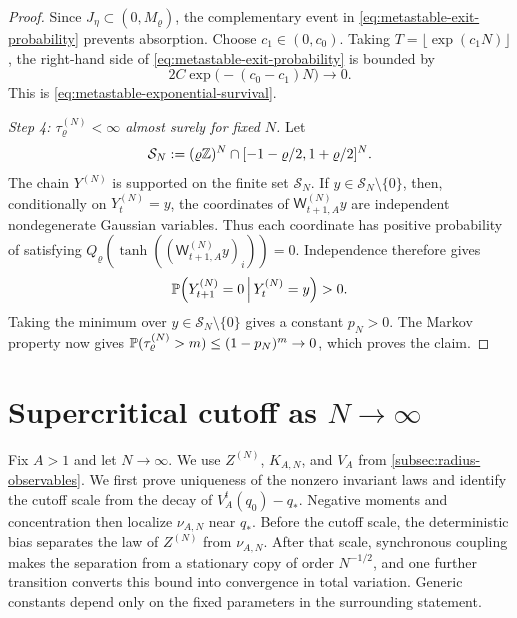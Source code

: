 \documentclass[11pt,reqno,a4paper]{article}
\newcommand{\Pp}{\P}
\begin{document}
\begin{proof}
  Since $J_\eta\subset(0,M_\varrho)$, the complementary event in
  \cref{eq:metastable-exit-probability} prevents absorption. Choose
  $c_1\in(0,c_0)$. Taking
  $T=\lfloor\exp(c_1N)\rfloor$, the right-hand side of
  \cref{eq:metastable-exit-probability} is bounded by
  \begin{equation*}
    2C\exp\bigl(-(c_0-c_1)N\bigr)
    \longrightarrow0.
  \end{equation*}
  This is \cref{eq:metastable-exponential-survival}.

  \emph{Step 4: $\tau_\varrho^{(N)}<\infty$ almost surely for fixed $N$.}
  Let
  \begin{equation*}
    \mathcal S_N
    :=
    (\varrho\mathbb{Z})^N\cap[-1-\varrho/2,1+\varrho/2]^N .
  \end{equation*}
  The chain $Y^{(N)}$ is supported on the finite set $\mathcal S_N$. If
  $y\in\mathcal S_N\setminus\{0\}$, then, conditionally on $Y_t^{(N)}=y$, the
  coordinates of $\mathsf W_{t+1,A}^{(N)}y$ are independent nondegenerate
  Gaussian variables. Thus each coordinate has positive probability of
  satisfying $Q_\varrho(\tanh((\mathsf W_{t+1,A}^{(N)}y)_i))=0$. Independence
  therefore gives
  \begin{equation*}
    \Pp\left(Y_{t+1}^{(N)}=0\,\middle|\,Y_t^{(N)}=y\right)>0 .
  \end{equation*}
  Taking the minimum over $y\in\mathcal S_N\setminus\{0\}$ gives a constant
  $p_N>0$. The Markov property now gives
  $\Pp(\tau_\varrho^{(N)}>m)\leq(1-p_N)^m\to0$, which proves the claim.
\end{proof}



\section{Supercritical cutoff as \texorpdfstring{$N\to\infty$}{N tends to infinity}}
\label{sec:supercritical-dimension}

Fix $A>1$ and let $N\to\infty$. We use $Z^{(N)}$, $K_{A,N}$, and $V_A$ from
\cref{subsec:radius-observables}. We first prove uniqueness of the nonzero
invariant laws and identify the cutoff scale from the decay of
$V_A^t(q_0)-q_\ast$. Negative moments and concentration then localize
$\nu_{A,N}$ near $q_\ast$. Before the cutoff scale, the deterministic bias
separates the law of $Z^{(N)}$ from $\nu_{A,N}$. After that scale, synchronous
coupling makes the separation from a stationary copy of order $N^{-1/2}$, and
one further transition converts this bound into convergence in total
variation. Generic constants depend only on the fixed parameters in the
surrounding statement.
\end{document}
